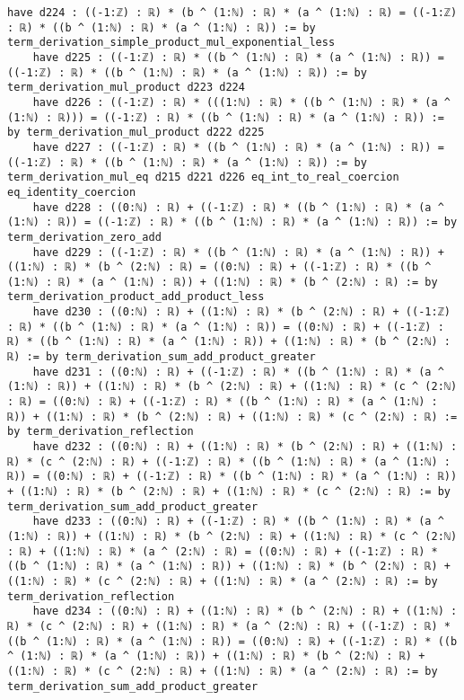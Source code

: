 \documentclass{article}
\begin{document}
\begin{tcolorbox}[colback=white!10, width=\linewidth]
\begin{lstlisting}[language=Lean4]
    have d224 : ((-1:ℤ) : ℝ) * (b ^ (1:ℕ) : ℝ) * (a ^ (1:ℕ) : ℝ) = ((-1:ℤ) : ℝ) * ((b ^ (1:ℕ) : ℝ) * (a ^ (1:ℕ) : ℝ)) := by term_derivation_simple_product_mul_exponential_less
    have d225 : ((-1:ℤ) : ℝ) * ((b ^ (1:ℕ) : ℝ) * (a ^ (1:ℕ) : ℝ)) = ((-1:ℤ) : ℝ) * ((b ^ (1:ℕ) : ℝ) * (a ^ (1:ℕ) : ℝ)) := by term_derivation_mul_product d223 d224
    have d226 : ((-1:ℤ) : ℝ) * (((1:ℕ) : ℝ) * ((b ^ (1:ℕ) : ℝ) * (a ^ (1:ℕ) : ℝ))) = ((-1:ℤ) : ℝ) * ((b ^ (1:ℕ) : ℝ) * (a ^ (1:ℕ) : ℝ)) := by term_derivation_mul_product d222 d225
    have d227 : ((-1:ℤ) : ℝ) * ((b ^ (1:ℕ) : ℝ) * (a ^ (1:ℕ) : ℝ)) = ((-1:ℤ) : ℝ) * ((b ^ (1:ℕ) : ℝ) * (a ^ (1:ℕ) : ℝ)) := by term_derivation_mul_eq d215 d221 d226 eq_int_to_real_coercion eq_identity_coercion
    have d228 : ((0:ℕ) : ℝ) + ((-1:ℤ) : ℝ) * ((b ^ (1:ℕ) : ℝ) * (a ^ (1:ℕ) : ℝ)) = ((-1:ℤ) : ℝ) * ((b ^ (1:ℕ) : ℝ) * (a ^ (1:ℕ) : ℝ)) := by term_derivation_zero_add
    have d229 : ((-1:ℤ) : ℝ) * ((b ^ (1:ℕ) : ℝ) * (a ^ (1:ℕ) : ℝ)) + ((1:ℕ) : ℝ) * (b ^ (2:ℕ) : ℝ) = ((0:ℕ) : ℝ) + ((-1:ℤ) : ℝ) * ((b ^ (1:ℕ) : ℝ) * (a ^ (1:ℕ) : ℝ)) + ((1:ℕ) : ℝ) * (b ^ (2:ℕ) : ℝ) := by term_derivation_product_add_product_less
    have d230 : ((0:ℕ) : ℝ) + ((1:ℕ) : ℝ) * (b ^ (2:ℕ) : ℝ) + ((-1:ℤ) : ℝ) * ((b ^ (1:ℕ) : ℝ) * (a ^ (1:ℕ) : ℝ)) = ((0:ℕ) : ℝ) + ((-1:ℤ) : ℝ) * ((b ^ (1:ℕ) : ℝ) * (a ^ (1:ℕ) : ℝ)) + ((1:ℕ) : ℝ) * (b ^ (2:ℕ) : ℝ) := by term_derivation_sum_add_product_greater
    have d231 : ((0:ℕ) : ℝ) + ((-1:ℤ) : ℝ) * ((b ^ (1:ℕ) : ℝ) * (a ^ (1:ℕ) : ℝ)) + ((1:ℕ) : ℝ) * (b ^ (2:ℕ) : ℝ) + ((1:ℕ) : ℝ) * (c ^ (2:ℕ) : ℝ) = ((0:ℕ) : ℝ) + ((-1:ℤ) : ℝ) * ((b ^ (1:ℕ) : ℝ) * (a ^ (1:ℕ) : ℝ)) + ((1:ℕ) : ℝ) * (b ^ (2:ℕ) : ℝ) + ((1:ℕ) : ℝ) * (c ^ (2:ℕ) : ℝ) := by term_derivation_reflection
    have d232 : ((0:ℕ) : ℝ) + ((1:ℕ) : ℝ) * (b ^ (2:ℕ) : ℝ) + ((1:ℕ) : ℝ) * (c ^ (2:ℕ) : ℝ) + ((-1:ℤ) : ℝ) * ((b ^ (1:ℕ) : ℝ) * (a ^ (1:ℕ) : ℝ)) = ((0:ℕ) : ℝ) + ((-1:ℤ) : ℝ) * ((b ^ (1:ℕ) : ℝ) * (a ^ (1:ℕ) : ℝ)) + ((1:ℕ) : ℝ) * (b ^ (2:ℕ) : ℝ) + ((1:ℕ) : ℝ) * (c ^ (2:ℕ) : ℝ) := by term_derivation_sum_add_product_greater
    have d233 : ((0:ℕ) : ℝ) + ((-1:ℤ) : ℝ) * ((b ^ (1:ℕ) : ℝ) * (a ^ (1:ℕ) : ℝ)) + ((1:ℕ) : ℝ) * (b ^ (2:ℕ) : ℝ) + ((1:ℕ) : ℝ) * (c ^ (2:ℕ) : ℝ) + ((1:ℕ) : ℝ) * (a ^ (2:ℕ) : ℝ) = ((0:ℕ) : ℝ) + ((-1:ℤ) : ℝ) * ((b ^ (1:ℕ) : ℝ) * (a ^ (1:ℕ) : ℝ)) + ((1:ℕ) : ℝ) * (b ^ (2:ℕ) : ℝ) + ((1:ℕ) : ℝ) * (c ^ (2:ℕ) : ℝ) + ((1:ℕ) : ℝ) * (a ^ (2:ℕ) : ℝ) := by term_derivation_reflection
    have d234 : ((0:ℕ) : ℝ) + ((1:ℕ) : ℝ) * (b ^ (2:ℕ) : ℝ) + ((1:ℕ) : ℝ) * (c ^ (2:ℕ) : ℝ) + ((1:ℕ) : ℝ) * (a ^ (2:ℕ) : ℝ) + ((-1:ℤ) : ℝ) * ((b ^ (1:ℕ) : ℝ) * (a ^ (1:ℕ) : ℝ)) = ((0:ℕ) : ℝ) + ((-1:ℤ) : ℝ) * ((b ^ (1:ℕ) : ℝ) * (a ^ (1:ℕ) : ℝ)) + ((1:ℕ) : ℝ) * (b ^ (2:ℕ) : ℝ) + ((1:ℕ) : ℝ) * (c ^ (2:ℕ) : ℝ) + ((1:ℕ) : ℝ) * (a ^ (2:ℕ) : ℝ) := by term_derivation_sum_add_product_greater

\end{lstlisting}
\end{tcolorbox}
\end{document}
